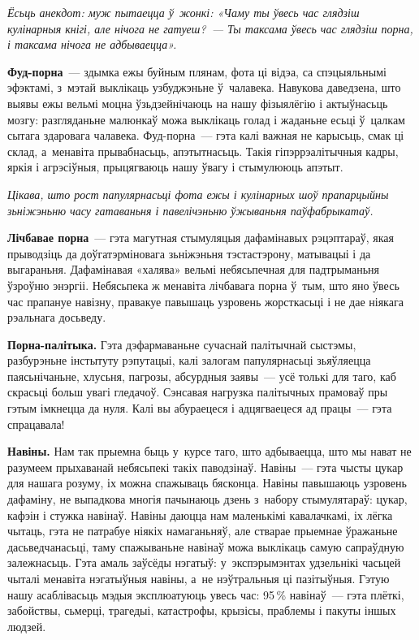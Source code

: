 \emph{Ёсьць анекдот: муж пытаецца ў~жонкі: «Чаму ты ўвесь час глядзіш кулінарныя кнігі, але нічога не гатуеш?~--- Ты таксама ўвесь час глядзіш порна, і таксама нічога не адбываецца».}

\textbf{Фуд-порна}~--- здымка ежы буйным плянам, фота ці відэа, са спэцыяльнымі эфэктамі, з~мэтай выклікаць узбуджэньне ў~чалавека. Навукова даведзена, што выявы ежы вельмі моцна ўзьдзейнічаюць на нашу фізыялёгію і актыўнасьць мозгу: разгляданьне малюнкаў можа выклікаць голад і жаданьне есьці ў~цалкам сытага здаровага чалавека. Фуд-порна~--- гэта калі важная не карысьць, смак ці склад, а~менавіта прывабнасьць, апэтытнасьць. Такія гіпэррэалітычныя кадры, яркія і агрэсіўныя, прыцягваюць нашу ўвагу і стымулююць апэтыт.

\emph{Цікава, што рост папулярнасьці фота ежы і кулінарных шоў прапарцыйны зьніжэньню часу гатаваньня і павелічэньню ўжываньня паўфабрыкатаў.}

\textbf{Лічбавае порна}~--- гэта магутная стымуляцыя дафамінавых рэцэптараў, якая прыводзіць да доўгатэрміновага зьніжэньня тэстастэрону, матывацыі і да выгараньня. Дафамінавая «халява» вельмі небясьпечная для падтрыманьня ўзроўню энэргіі. Небясьпека ж менавіта лічбавага порна ў~тым, што яно ўвесь час прапануе навізну, правакуе павышаць узровень жорсткасьці і не дае ніякага рэальнага досьведу. 


\textbf{Порна-палітыка.} Гэта дэфармаваньне сучаснай палітычнай сыстэмы, разбурэньне інстытуту рэпутацыі, калі залогам папулярнасьці зьяўляецца паясьнічаньне, хлусьня, пагрозы, абсурдныя заявы~--- усё толькі для таго, каб скрасьці больш увагі гледачоў. Сэнсавая нагрузка палітычных прамоваў пры гэтым імкнецца да нуля. Калі вы абураецеся і адцягваецеся ад працы~--- гэта спрацавала!

\textbf{Навіны.} Нам так прыемна быць у~курсе таго, што адбываецца, што мы нават не разумеем прыхаванай небясьпекі такіх паводзінаў. Навіны~--- гэта чысты цукар для нашага розуму, іх можна спажываць бясконца. Навіны павышаюць узровень дафаміну, не выпадкова многія пачынаюць дзень з~набору стымулятараў: цукар, кафэін і стужка навінаў. Навіны даюцца нам маленькімі кавалачкамі, іх лёгка чытаць, гэта не патрабуе ніякіх намаганьняў, але стварае прыемнае ўражаньне дасьведчанасьці, таму спажываньне навінаў можа выклікаць самую сапраўдную залежнасьць. Гэта амаль заўсёды нэгатыў: у~экспэрымэнтах удзельнікі часьцей чыталі менавіта нэгатыўныя навіны, а~не нэўтральныя ці пазітыўныя. Гэтую нашу асаблівасьць мэдыя эксплюатуюць увесь час: 95\,\% навінаў~--- гэта плёткі, забойствы, сьмерці, трагедыі, катастрофы, крызісы, праблемы і пакуты іншых людзей.

